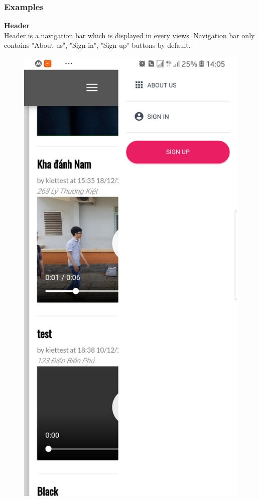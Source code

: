\subsubsection{Examples}
	\textbf{Header}
\\
Header is a navigation bar which is displayed in every views. Navigation bar only contains "About us", "Sign in", "Sign up" buttons by default.
\begin{figure}[!htb]
  \includegraphics[width=\linewidth]{images/chap4/header_not_login_mb.jpg}

\end{figure}
